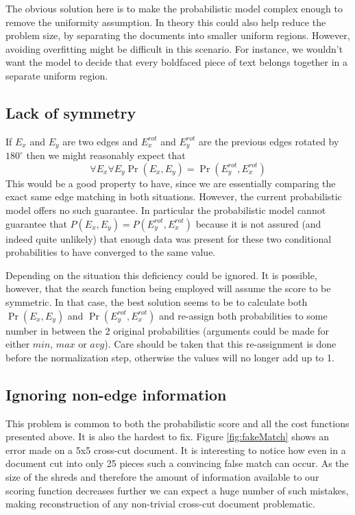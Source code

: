 The obvious solution here is to make the probabilistic model complex enough to remove the uniformity assumption. In theory this could also help reduce the problem size, by separating the documents into smaller uniform regions. However, avoiding overfitting might be difficult in this scenario. For instance, we wouldn't want the model to decide that every boldfaced piece of text belongs together in a separate uniform region.

\subsection{Lack of symmetry}
If \(E_x\) and \(E_y\) are two edges and \(E_x^{rot}\) and \(E_y^{rot}\) are the previous edges rotated by \(180^\circ\) then we might reasonably expect that \[\forall E_x \forall E_y \Pr(E_x,E_y) = \Pr(E_y^{rot},E_x^{rot})\] This would be a good property to have, since we are essentially comparing the exact same edge matching in both situations. However, the current probabilistic model offers no such guarantee. In particular the probabilistic model cannot guarantee that \(P(E_x,E_y) = P(E_y^{rot},E_x^{rot}) \) because it is not assured (and indeed quite unlikely) that enough data was present for these two conditional probabilities to have converged to the same value.

Depending on the situation this deficiency could be ignored. It is possible, however, that the search function being employed will assume the score to be symmetric. In that case, the best solution seems to be to calculate both \(\Pr(E_x,E_y)\) and  \(\Pr(E_y^{rot},E_x^{rot})\) and re-assign both probabilities to some number in between the 2 original probabilities (arguments could be made for either $min$, $max$ or $avg$). Care should be taken that this re-assignment is done before the normalization step, otherwise the values will no longer add up to 1.

\subsection{Ignoring non-edge information}
This problem is common to both the probabilistic score and all the cost functions presented above. It is also the hardest to fix. Figure \ref{fig:fakeMatch} shows an error made on a 5x5 cross-cut document. It is interesting to notice how even in a document cut into only 25 pieces such a convincing false match can occur. As the size of the shreds and therefore the amount of information available to our scoring function decreases further we can expect a huge number of such mistakes, making reconstruction of any non-trivial cross-cut document problematic.

